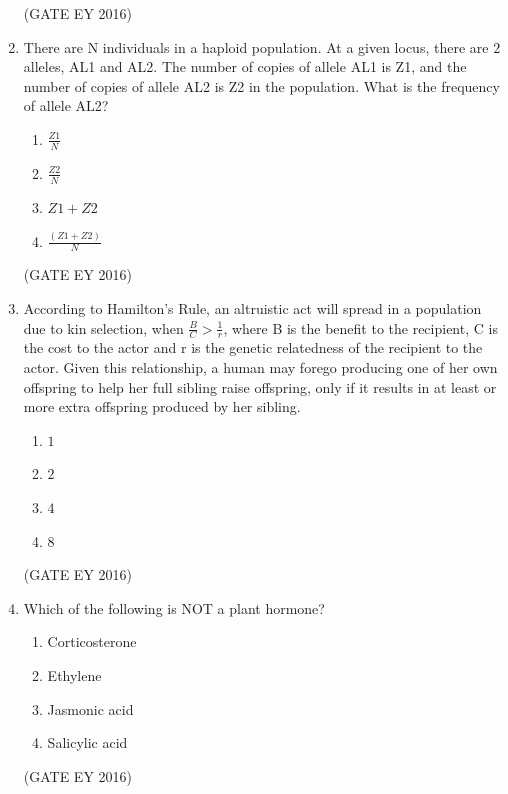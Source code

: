 \documentclass[journal]{IEEEtran}
\begin{document}
\begin{enumerate}[label=Q.\arabic*.]
\hfill{(GATE EY 2016)}

\item There are N individuals in a haploid population. At a given locus, there are $2$ alleles, AL1 and AL2. The number of copies of allele AL1 is Z1, and the number of copies of allele AL2 is Z2 in the population. What is the frequency of allele AL2?
\begin{multicols}{4}
\begin{enumerate}
    \item $\frac{Z1}{N}$
    \item $\frac{Z2}{N}$
    \item $Z1+Z2$
    \item $\frac{(Z1+Z2)}{N}$
\end{enumerate}
\end{multicols}
\hfill{(GATE EY 2016)}

\item According to Hamilton's Rule, an altruistic act will spread in a population due to kin selection, when $\frac{B}{C} > \frac{1}{r}$, where B is the benefit to the recipient, C is the cost to the actor and r is the genetic relatedness of the recipient to the actor. Given this relationship, a human may forego producing one of her own offspring to help her full sibling raise offspring, only if it results in at least \underline{\hspace{1cm}} or \underline{\hspace{1cm}} more extra offspring produced by her sibling.
\begin{multicols}{4}
\begin{enumerate}
    \item $1$
    \item $2$
    \item $4$
    \item $8$
\end{enumerate}
\end{multicols}
\hfill{(GATE EY 2016)}

\item Which of the following is NOT a plant hormone?
\begin{multicols}{4}
\begin{enumerate}
    \item Corticosterone
    \item Ethylene
    \item Jasmonic acid
    \item Salicylic acid
\end{enumerate}
\end{multicols}
\hfill{(GATE EY 2016)}


\end{enumerate}
\end{document}
